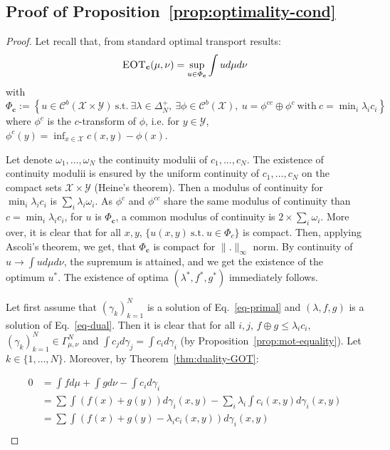 \subsection{Proof of Proposition~\ref{prop:optimality-cond}}
\label{prv:optimality-cond}
\begin{proof}
Let recall that, from standard optimal transport results:
\begin{align*}
    \textsc{EOT}_\mathbf{c}(\mu,\nu) = \sup_{u\in\Phi_\mathbf{c}}\int u d\mu d\nu
\end{align*}
with $\Phi_\mathbf{c}:=\left\{u\in\mathcal{C}^b(\mathcal{\mathcal{X}\times\mathcal{Y}}) ~\mathrm{s.t.}~ \exists\lambda \in \Delta_N^+,~\exists\phi\in\mathcal{C}^b(\mathcal{X}),~ u =\phi^{cc}\oplus\phi^c~\mathrm{with}~c=\min_i\lambda_ic_i\right\}$ where $\phi^c$ is the $c$-transform of $\phi$, i.e. for $y\in\mathcal{Y}$, $\phi^c(y)=\inf_{x\in\mathcal{X}}c(x,y)-\phi(x)$. 

Let denote $\omega_1,\dots,\omega_N$ the continuity modulii of $c_1,...,c_N$. The existence of continuity modulii is ensured by the uniform continuity of $c_1,\dots,c_N$ on the compact sets $\mathcal{X}\times\mathcal{Y}$ (Heine's theorem). Then a modulus of continuity for $\min_i\lambda_ic_i$ is $\sum_i\lambda_i\omega_i$. As $\phi^c$ and $\phi^{cc}$ share the same modulus of continuity than $c=\min_i\lambda_ic_i$, for $u$ is $\Phi_\mathbf{c}$, a common modulus of continuity is $2\times\sum_i\omega_i$. More over, it is clear that for all $x,y$, $\{u(x,y)~\mathrm{s.t.}~u\in \Phi_c\}$ is compact. Then, applying Ascoli's theorem, we get, that $\Phi_{\mathbf{c}}$ is compact for $\lVert.\rVert_\infty$ norm. By continuity of $u\to\int u d\mu d\nu$, the supremum is attained, and we get the existence of the optimum $u^*$. The existence of optima $(\lambda^*,f^*,g^*)$ immediately follows.

Let first assume that $(\gamma_k)_{k=1}^N$ is a solution of Eq.~\eqref{eq-primal} and $(\lambda,f,g)$ is a solution of Eq.~\eqref{eq-dual}. Then it is clear that for all $i,j$, $f\oplus g\leq \lambda_ic_i$, $(\gamma_k)_{k=1}^N\in\Gamma^N_{\mu,\nu}$ and $\int c_jd\gamma_j=\int c_id\gamma_i$ (by Proposition~\ref{prop:mot-equality}). Let $k\in\{1,\dots,N\}$. Moreover, by Theorem~\ref{thm:duality-GOT}:

\begin{align*}
   0&=\int fd\mu +\int gd\nu -\int c_id\gamma_i\\
    & = \sum \int (f(x)+g(y)) d\gamma_i(x,y)-\sum_i\lambda_i\int c_i(x,y) d\gamma_i(x,y)\\
    & = \sum \int (f(x)+g(y)-\lambda_ic_i(x,y)) d\gamma_i(x,y)\\
\end{align*}


\end{proof}
